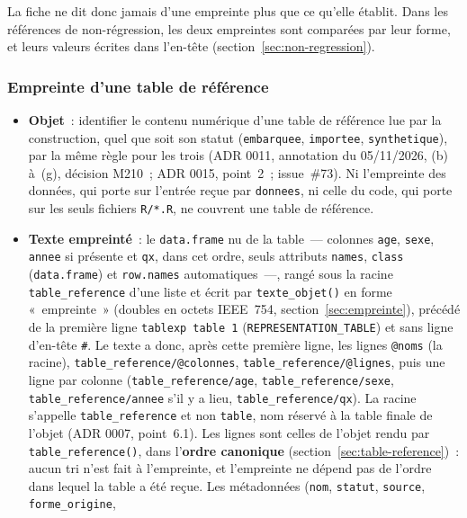 \documentclass[a4paper,11pt]{article}
\newcommand{\code}[1]{\texttt{\small #1}}
\begin{document}
\noindent
La fiche ne dit donc jamais d'une empreinte plus que ce qu'elle établit.
Dans les références de non-régression, les deux empreintes sont comparées
par leur forme, et leurs valeurs écrites dans l'en-tête
(section~\ref{sec:non-regression}).

\subsubsection*{Empreinte d'une table de référence}

\begin{itemize}[leftmargin=*, itemsep=2pt]
  \item \textbf{Objet}~: identifier le contenu numérique d'une table de
    référence lue par la construction, quel que soit son statut
    (\code{embarquee}, \code{importee}, \code{synthetique}), par la même
    règle pour les trois (ADR 0011, annotation du 05/11/2026, (b) à~(g),
    décision M210~; ADR 0015, point~2~; issue~\#73). Ni l'empreinte des
    données, qui porte sur l'entrée reçue par \code{donnees}, ni celle du
    code, qui porte sur les seuls fichiers \code{R/*.R}, ne couvrent une
    table de référence.
  \item \textbf{Texte empreinté}~: le \code{data.frame} nu de la table~---
    colonnes \code{age}, \code{sexe}, \code{annee} si présente et
    \code{qx}, dans cet ordre, seuls attributs \code{names}, \code{class}
    (\code{data.frame}) et \code{row.names} automatiques~---, rangé sous la
    racine \code{table\_reference} d'une liste et écrit par
    \code{texte\_objet()} en forme «~empreinte~» (doubles en octets
    IEEE~754, section~\ref{sec:empreinte}), précédé de la première ligne
    \code{tablexp table 1} (\code{REPRESENTATION\_TABLE}) et sans ligne
    d'en-tête \code{\#}. Le texte a donc, après cette première ligne, les
    lignes \code{@noms} (la racine), \code{table\_reference/@colonnes},
    \code{table\_reference/@lignes}, puis une ligne par colonne
    (\code{table\_reference/age}, \code{table\_reference/sexe},
    \code{table\_reference/annee} s'il y a lieu, \code{table\_reference/qx}).
    La racine s'appelle \code{table\_reference} et non \code{table}, nom
    réservé à la table finale de l'objet (ADR 0007, point~6.1). Les lignes
    sont celles de l'objet rendu par \code{table\_reference()}, dans
    l'\textbf{ordre canonique} (section~\ref{sec:table-reference})~: aucun
    tri n'est fait à l'empreinte, et l'empreinte ne dépend pas de l'ordre
    dans lequel la table a été reçue. Les métadonnées (\code{nom},
    \code{statut}, \code{source}, \code{forme\_origine},

\end{itemize}
\end{document}
